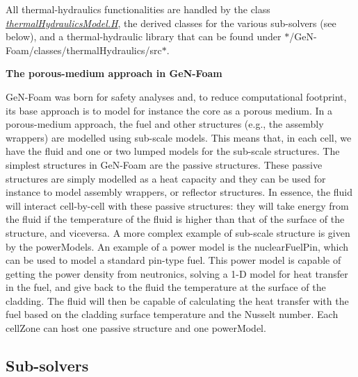 All thermal-\/hydraulics functionalities are handled by the class {\itshape \hyperlink{thermalHydraulicsModel_8H}{thermal\+Hydraulics\+Model.\+H}}, the derived classes for the various sub-\/solvers (see below), and a thermal-\/hydraulic library that can be found under $\ast$/\+Ge\+N-\/\+Foam/classes/thermal\+Hydraulics/src$\ast$.

 {\bfseries The porous-\/medium approach in Ge\+N-\/\+Foam}

Ge\+N-\/\+Foam was born for safety analyses and, to reduce computational footprint, its base approach is to model for instance the core as a porous medium. In a porous-\/medium approach, the fuel and other structures (e.\+g., the assembly wrappers) are modelled using sub-\/scale models. This means that, in each cell, we have the fluid and one or two lumped models for the sub-\/scale structures. The simplest structures in Ge\+N-\/\+Foam are the passive structures. These passive structures are simply modelled as a heat capacity and they can be used for instance to model assembly wrappers, or reflector structures. In essence, the fluid will interact cell-\/by-\/cell with these passive structures\+: they will take energy from the fluid if the temperature of the fluid is higher than that of the surface of the structure, and viceversa. A more complex example of sub-\/scale structure is given by the power\+Models. An example of a power model is the nuclear\+Fuel\+Pin, which can be used to model a standard pin-\/type fuel. This power model is capable of getting the power density from neutronics, solving a 1-\/D model for heat transfer in the fuel, and give back to the fluid the temperature at the surface of the cladding. The fluid will then be capable of calculating the heat transfer with the fuel based on the cladding surface temperature and the Nusselt number. Each cell\+Zone can host one passive structure and one power\+Model. ~\newline
 

\subsection*{Sub-\/solvers}


